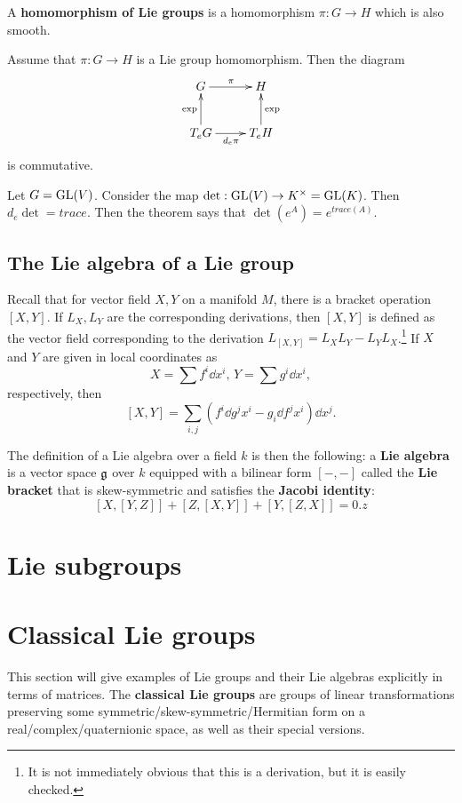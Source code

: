 \documentclass[11pt, english]{article}
\begin{document}
A \textbf{homomorphism of Lie groups} is a homomorphism $\pi:G \to H$ which is also smooth.

\begin{thm}
 Assume that $\pi:G \to H$ is a Lie group homomorphism. Then the diagram
$$
\xymatrix{
G \ar[r]^\pi & H \\
T_eG \ar[u]^{\exp} \ar[r]_{d_e\pi} & T_e H \ar[u]_\exp
}
$$
is commutative.
\end{thm}

\begin{example}
  Let $G = \operatorname{GL}(V)$. Consider the map $\det:\operatorname{GL}(V) \to K^\times = \operatorname{GL}(K)$. Then $d_e \det = trace$. Then the theorem says that $\det(e^A)=e^{trace(A)}$.
\end{example}

\subsection{The Lie algebra of a Lie group}

Recall that for vector field $X,Y$ on a manifold $M$, there is a bracket operation $[X,Y]$. If $L_X,L_Y$ are the corresponding derivations, then $[X,Y]$ is defined as the vector field corresponding to the derivation $L_{[X,Y]} = L_X L_Y - L_Y L_X$.\footnote{It is not immediately obvious that this is a derivation, but it is easily checked.} If $X$ and $Y$ are given in local coordinates as 
$$
X = \sum f^i \dd{}{x^i}, \, Y = \sum g^i \dd{}{x^i},
$$
respectively, then
$$
[X,Y] = \sum_{i,j} \left(f^i \dd{g^j}{x^i} - g_i \dd{f^j}{x^i} \right) \dd{}{x^j}.
$$

The definition of a Lie algebra over a field $k$ is then the following: a \textbf{Lie algebra} is a vector space $\mathfrak g$ over $k$ equipped with a bilinear form $[-,-]$ called the \textbf{Lie bracket} that is skew-symmetric and satisfies the \textbf{Jacobi identity}:
$$
[X,[Y,Z]] + [Z,[X,Y]] + [Y,[Z,X]] = 0.z
$$

\section{Lie subgroups}



\newpage
\section{Classical Lie groups}

This section will give examples of Lie groups and their Lie algebras explicitly in terms of matrices. The \textbf{classical Lie groups} are groups of linear transformations preserving some symmetric/skew-symmetric/Hermitian form on a real/complex/quaternionic space, as well as their special versions. 
\end{document}
